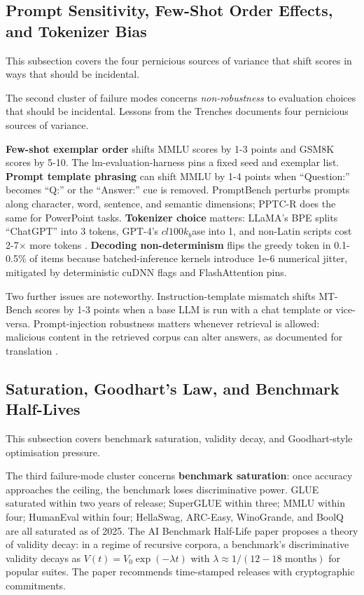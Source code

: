\documentclass{article}
\begin{document}
\subsection{Prompt Sensitivity, Few-Shot Order Effects, and Tokenizer Bias}\label{prompt-sensitivity-few-shot-order-effects-and-tokenizer-bias}

This subsection covers the four pernicious sources of variance that shift scores in ways that should be incidental.

The second cluster of failure modes concerns \emph{non-robustness} to evaluation choices that should be incidental. Lessons from the Trenches \cite{biderman20242024} documents four pernicious sources of variance.

\textbf{Few-shot exemplar order} shifts MMLU scores by 1-3 points and GSM8K scores by 5-10. The lm-evaluation-harness pins a fixed seed and exemplar list. \textbf{Prompt template phrasing} can shift MMLU by 1-4 points when ``Question:'' becomes ``Q:'' or the ``Answer:'' cue is removed. PromptBench perturbs prompts along character, word, sentence, and semantic dimensions; PPTC-R \cite{zhang20242024} does the same for PowerPoint tasks. \textbf{Tokenizer choice} matters: LLaMA's BPE splits ``ChatGPT'' into 3 tokens, GPT-4's \(cl100k_b\)ase into 1, and non-Latin scripts cost 2-7× more tokens \cite{petrov20232023}. \textbf{Decoding non-determinism} flips the greedy token in 0.1-0.5\% of items because batched-inference kernels introduce 1e-6 numerical jitter, mitigated by deterministic cuDNN flags and FlashAttention pins.

Two further issues are noteworthy. Instruction-template mismatch shifts MT-Bench scores by 1-3 points when a base LLM is run with a chat template or vice-versa. Prompt-injection robustness matters whenever retrieval is allowed: malicious content in the retrieved corpus can alter answers, as documented for translation \cite{sun2024scalingbehaviorofm}.

\subsection{Saturation, Goodhart's Law, and Benchmark Half-Lives}\label{saturation-goodharts-law-and-benchmark-half-lives}

This subsection covers benchmark saturation, validity decay, and Goodhart-style optimisation pressure.

The third failure-mode cluster concerns \textbf{benchmark saturation}: once accuracy approaches the ceiling, the benchmark loses discriminative power. GLUE saturated within two years of release; SuperGLUE within three; MMLU within four; HumanEval within four; HellaSwag, ARC-Easy, WinoGrande, and BoolQ are all saturated as of 2025. The AI Benchmark Half-Life paper \cite{white20242024} proposes a theory of validity decay: in a regime of recursive corpora, a benchmark's discriminative validity decays as \(V(t) = V_0 \exp(-\lambda t)\) with \(\lambda \approx 1/(12-18 \text{ months})\) for popular suites. The paper recommends time-stamped releases with cryptographic commitments.
\end{document}
